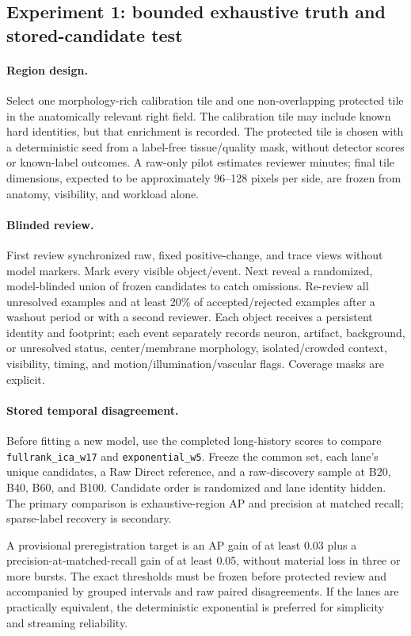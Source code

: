 \subsection{Experiment 1: bounded exhaustive truth and stored-candidate test}

\paragraph{Region design.}
Select one morphology-rich calibration tile and one non-overlapping protected
tile in the anatomically relevant right field. The calibration tile may include
known hard identities, but that enrichment is recorded. The protected tile is
chosen with a deterministic seed from a label-free tissue/quality mask, without
detector scores or known-label outcomes. A raw-only pilot estimates reviewer
minutes; final tile dimensions, expected to be approximately 96--128 pixels per
side, are frozen from anatomy, visibility, and workload alone.

\paragraph{Blinded review.}
First review synchronized raw, fixed positive-change, and trace views without
model markers. Mark every visible object/event. Next reveal a randomized,
model-blinded union of frozen candidates to catch omissions. Re-review all
unresolved examples and at least 20\% of accepted/rejected examples after a
washout period or with a second reviewer. Each object receives a persistent
identity and footprint; each event separately records neuron, artifact,
background, or unresolved status, center/membrane morphology,
isolated/crowded context, visibility, timing, and motion/illumination/vascular
flags. Coverage masks are explicit.

\paragraph{Stored temporal disagreement.}
Before fitting a new model, use the completed long-history scores to compare
\texttt{fullrank\_ica\_w17} and \texttt{exponential\_w5}. Freeze the common set,
each lane's unique candidates, a Raw Direct reference, and a raw-discovery
sample at B20, B40, B60, and B100. Candidate order is randomized and lane
identity hidden. The primary comparison is exhaustive-region AP and precision
at matched recall; sparse-label recovery is secondary.

A provisional preregistration target is an AP gain of at least 0.03 plus a
precision-at-matched-recall gain of at least 0.05, without material loss in
three or more bursts. The exact thresholds must be frozen before protected
review and accompanied by grouped intervals and raw paired disagreements. If
the lanes are practically equivalent, the deterministic exponential is
preferred for simplicity and streaming reliability.

